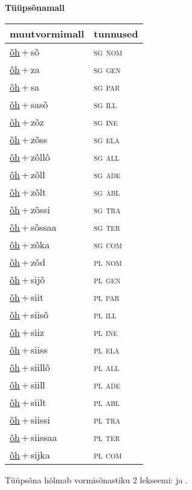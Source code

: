 
\vspace{1.8em}
\begin{minipage}{\textwidth}
\textbf{Tüüpsõnamall \,}\\

\begin{sideways}
\begin{tabular}{l l}
muutvormimall & tunnused \\
\hline
\underline{õh}\,+\,sõ & \textsc{ sg nom } \\
\underline{õh}\,+\,za & \textsc{ sg gen } \\
\underline{õh}\,+\,sa & \textsc{ sg par } \\
\underline{õh}\,+\,sasõ & \textsc{ sg ill } \\
\underline{õh}\,+\,zõz & \textsc{ sg ine } \\
\underline{õh}\,+\,zõss & \textsc{ sg ela } \\
\underline{õh}\,+\,zõllõ & \textsc{ sg all } \\
\underline{õh}\,+\,zõll & \textsc{ sg ade } \\
\underline{õh}\,+\,zõlt & \textsc{ sg abl } \\
\underline{õh}\,+\,zõssi & \textsc{ sg tra } \\
\underline{õh}\,+\,sõssaa & \textsc{ sg ter } \\
\underline{õh}\,+\,zõka & \textsc{ sg com } \\
\underline{õh}\,+\,zõd & \textsc{ pl nom } \\
\underline{õh}\,+\,sijõ & \textsc{ pl gen } \\
\underline{õh}\,+\,siit & \textsc{ pl par } \\
\underline{õh}\,+\,siisõ & \textsc{ pl ill } \\
\underline{õh}\,+\,siiz & \textsc{ pl ine } \\
\underline{õh}\,+\,siiss & \textsc{ pl ela } \\
\underline{õh}\,+\,siillõ & \textsc{ pl all } \\
\underline{õh}\,+\,siill & \textsc{ pl ade } \\
\underline{õh}\,+\,siilt & \textsc{ pl abl } \\
\underline{õh}\,+\,siissi & \textsc{ pl tra } \\
\underline{õh}\,+\,siissaa & \textsc{ pl ter } \\
\underline{õh}\,+\,sijka & \textsc{ pl com } \\
\end{tabular}
\end{sideways}
\label{tab:tüüpsõnamall-õhsõ}

\end{minipage}

 
\vspace{1em}
\noindent Tüüpsõna hõlmab vormisõnastiku 2 lekseemi:  ja .
